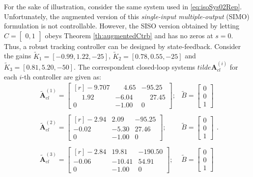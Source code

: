 \documentclass[a4paper,11pt]{book}
\numberwithin{figure}{chapter}
\numberwithin{equation}{chapter}
\numberwithin{table}{chapter}
\theoremstyle{definition}
\newtheorem{example}{Example}[chapter]
\newcounter{boxed-theorem}
\newcounter{boxed-lemma}
\newcounter{boxed-definition}
\newcounter{boxed-example}
\newenvironment{boxed-example}[1]
{\colorlet{shadecolor}{pastelRed!15} \begin{shaded} \begin{example}{#1}}
{\end{example} \end{shaded}}
\begin{document}
\begin{boxed-example}{}
	For the sake of illustration, consider the same system used in \eqref{eq:isoSys02Rep}. Unfortunately, the augmented version of this \textit{single-input multiple-output} (SIMO) formulation is not controllable. However, the SISO version obtained by letting $C = \begin{bmatrix} 0, 1 \end{bmatrix}$ obeys Theorem \ref{th:augmentedCtrb} and has no zeros at $s=0$. Thus, a robust tracking controller can be designed by state-feedback. Consider the gains $\tilde{K}_1 = [-0.99, 1.22, -25]$, $\tilde{K}_2 = [0.78, 0.55, -25]$ and $\tilde{K}_3 = [0.81, 5.20, -50]$. The correspondent closed-loop systems $tilde{\bm{A}}^{(i)}_{cl}$ for each $i$-th controller are given as:
	\begin{equation}
	\begin{matrix}
		\tilde{\bm{A}}^{(1)}_{cl} = \begin{bmatrix*}[r] 
	       -9.70 7 & \phantom{-}4.65 & -95.25 \\
    \phantom{-}1.92 & -6.04 & \phantom{-}27.45 \\
         0 & -1.00     &   0
	    \end{bmatrix*}; & \tilde{B} = \begin{bmatrix} 0 \\ 0 \\ 1 \end{bmatrix} \\ \\
	    \tilde{\bm{A}}^{(2)}_{cl} = \begin{bmatrix*}[r] 
	        -2.94 &  2.09 & -95.25 \\
   			-0.02 & -5.30 &  27.46 \\
         		  0 & -1.00  &      0
	    \end{bmatrix*}; & \tilde{B} = \begin{bmatrix} 0 \\ 0 \\ 1 \end{bmatrix} \\ \\
	    \tilde{\bm{A}}^{(3)}_{cl} = \begin{bmatrix*}[r] 
	        -2.84 & 19.81 &-190.50 \\
	 	  	-0.06 & -10.41 & 54.91 \\
        		 0  & -1.00   &     0
	    \end{bmatrix*}; & \tilde{B} = \begin{bmatrix} 0 \\ 0 \\ 1 \end{bmatrix}
	\end{matrix}.
	\end{equation}
\end{boxed-example}
\end{document}
